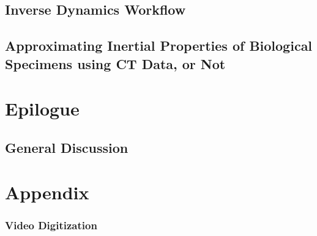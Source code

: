 \documentclass[12pt,twoside]{report}
\newcommand\cleartoleftpage{%
\clearpage
}
\newcommand\cleartorightpage{%
\clearpage
\hbox{}
}
\begin{document}
\chapter{Inverse Dynamics Workflow}\label{cpt:dynamics_workflow}
%

\cleartoleftpage
\chapter[Inertial Properties]{Approximating Inertial Properties of Biological Specimens using CT Data, or Not}\label{cpt:inertials}
%



\cleartorightpage
\part{Epilogue}
\chapter{General Discussion}\label{cpt:generaldiscussion}
\clearpage
%



\cleartorightpage
\part{Appendix}\label{acknowledgements}

\addtocounter{chapter}{+1}
\setcounter{section}{0}

% 
% 

\clearpage
\section{Video Digitization}\label{cpt:digitization}
%
\end{document}
